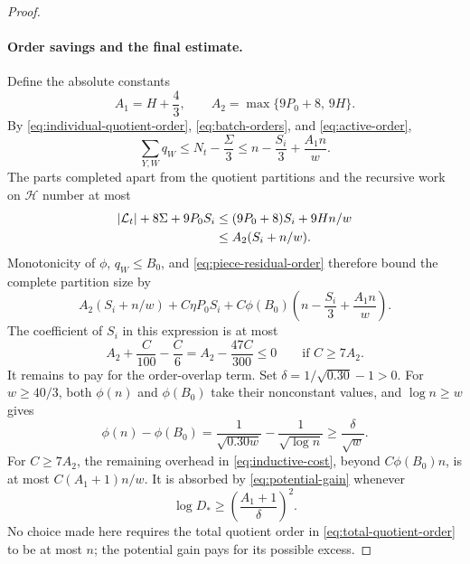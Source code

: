 \begin{proof}
\paragraph{Order savings and the final estimate.}
Define the absolute constants
\[
 A_1=H+\frac43,\qquad
 A_2=\max\{9P_0+8,\,9H\}.
\]
By \eqref{eq:individual-quotient-order},
\eqref{eq:batch-orders}, and \eqref{eq:active-order},
\begin{equation}\label{eq:total-quotient-order}
 \sum_{Y,W}q_W\le N_t-\frac{\Sigma}{3}
 \le n-\frac{S_i}{3}+\frac{A_1n}{w}.
\end{equation}
The parts completed apart from the quotient partitions and
the recursive work on \(\mathcal H\) number at most
\begin{align}
 |\mathcal L_t|+8\Sigma+9P_0S_i
 &\le (9P_0+8)S_i+9Hn/w\notag\\
 &\le A_2(S_i+n/w).\label{eq:nonrecursive-cost}
\end{align}
Monotonicity of \(\phi\), \(q_W\le B_0\), and
\eqref{eq:piece-residual-order} therefore bound the complete
partition size by
\begin{equation}\label{eq:inductive-cost}
 A_2(S_i+n/w)+C\eta P_0S_i
 +C\phi(B_0)\left(n-\frac{S_i}{3}+\frac{A_1n}{w}\right).
\end{equation}
The coefficient of \(S_i\) in this expression is at most
\[
 A_2+\frac C{100}-\frac C6
 =A_2-\frac{47C}{300}\le0
 \qquad\text{if }C\ge7A_2.
\]
It remains to pay for the order-overlap term. Set
\(\delta=1/\sqrt{0.30}-1>0\). For \(w\ge40/3\), both
\(\phi(n)\) and \(\phi(B_0)\) take their nonconstant
values, and \(\log n\ge w\) gives
\begin{equation}\label{eq:potential-gain}
 \phi(n)-\phi(B_0)
 =\frac1{\sqrt{0.30w}}-\frac1{\sqrt{\log n}}
 \ge\frac{\delta}{\sqrt w}.
\end{equation}
For \(C\ge7A_2\), the remaining overhead in
\eqref{eq:inductive-cost}, beyond \(C\phi(B_0)n\), is at
most \(C(A_1+1)n/w\). It is absorbed by
\eqref{eq:potential-gain} whenever
\begin{equation}\label{eq:cutoff-absorption}
 \log D_*\ge\left(\frac{A_1+1}{\delta}\right)^2.
\end{equation}
No choice made here requires the total quotient order in
\eqref{eq:total-quotient-order} to be at most \(n\); the
potential gain pays for its possible excess.


\end{proof}
